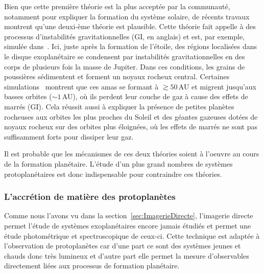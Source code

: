 Bien que cette première théorie est la plus acceptée par la communauté, notamment pour expliquer la formation du système solaire, de récents travaux montrent qu'une deuxi\hyp{}ème théorie est plausible. Cette théorie fait appelle à des processus d'instabilités gravitationnelles (\ac{GI}, en anglais) et est, par exemple, simulée dans~\cite{nayakshin2017}. Ici, juste après la formation de l'étoile, des régions localisées dans le disque exoplanétaire se condensent par instabilités gravitationnelles en des corps de plusieurs fois la masse de Jupiter. Dans ces conditions, les grains de poussières sédimentent et forment un noyaux rocheux central. Certaines simulations~\citep{boley2010} montrent que ces amas se formant à $\gtrsim 50 \,$AU et migrent jusqu'aux basses orbites ($\sim 1 \,$AU), où ils perdent leur couche de gaz à cause des effets de marrés (\ac{GI}). Cela réussit aussi à expliquer la présence de petites planètes rocheuses aux orbites les plus proches du Soleil et des géantes gazeuses dotées de noyaux rocheux sur des orbites plus éloignées, où les effets de marrés ne sont pas suffisamment forts pour dissiper leur gaz.

Il est probable que les mécanismes de ces deux théories soient à l'oeuvre au cours de la formation planétaire. L'étude d'un plus grand nombres de systèmes protoplanétaires est donc indispensable pour contraindre ces théories.


\subsubsection{L'accrétion de matière des protoplanètes}
\label{sec:AccretionAlpha}

Comme nous l'avons vu dans la section~\ref{sec:ImagerieDirecte}, l'imagerie directe permet l'étude de systèmes exoplanétaires encore jamais étudiés et permet une étude photométrique et spectroscopique de ceux-ci. Cette technique est adaptée à l'observation de protoplanètes car d'une part ce sont des systèmes jeunes et chauds donc très lumineux et d'autre part elle permet la mesure d'observables directement liées aux processus de formation planétaire.

